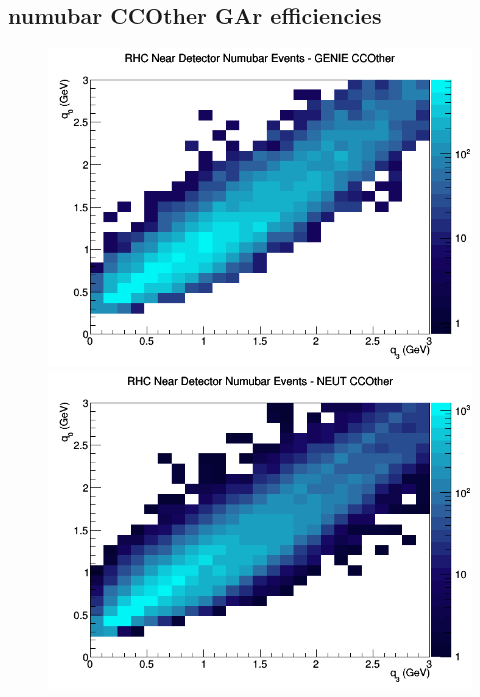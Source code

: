 \subsection{numubar CCOther GAr efficiencies}
\begin{figure}[h]
\includegraphics[width=\linewidth]{eff_q0_q3/GAr/CCOther_RHC_ND_numubar_q3_q0_GENIE.png}
\endminipage
{}
\includegraphics[width=\linewidth]{eff_q0_q3/GAr/CCOther_RHC_ND_numubar_q3_q0_NEUT.png}
\endminipage
{}

\end{figure}
